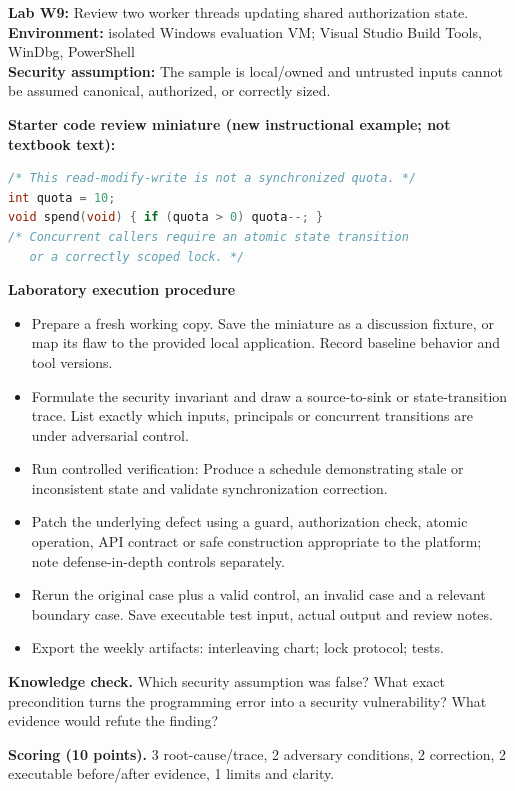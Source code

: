 \documentclass[10pt,letterpaper]{article}
\begin{document}
\begin{insight}\textbf{Lab W9:} Review two worker threads updating shared authorization state.\\\textbf{Environment:} isolated Windows evaluation VM; Visual Studio Build Tools, WinDbg, PowerShell\\\textbf{Security assumption:} The sample is local/owned and untrusted inputs cannot be assumed canonical, authorized, or correctly sized.\end{insight}
\textbf{Starter code review miniature (new instructional example; not textbook text):}
\begin{lstlisting}[language=C]
/* This read-modify-write is not a synchronized quota. */
int quota = 10;
void spend(void) { if (quota > 0) quota--; }
/* Concurrent callers require an atomic state transition
   or a correctly scoped lock. */
\end{lstlisting}
\textbf{Laboratory execution procedure}
\begin{itemize}[leftmargin=*,itemsep=2pt]
\item Prepare a fresh working copy. Save the miniature as a discussion fixture, or map its flaw to the provided local application. Record baseline behavior and tool versions.
\item Formulate the security invariant and draw a source-to-sink or state-transition trace. List exactly which inputs, principals or concurrent transitions are under adversarial control.
\item Run controlled verification: Produce a schedule demonstrating stale or inconsistent state and validate synchronization correction.
\item Patch the underlying defect using a guard, authorization check, atomic operation, API contract or safe construction appropriate to the platform; note defense-in-depth controls separately.
\item Rerun the original case plus a valid control, an invalid case and a relevant boundary case. Save executable test input, actual output and review notes.
\item Export the weekly artifacts: interleaving chart; lock protocol; tests.
\end{itemize}
\textbf{Knowledge check.} Which security assumption was false? What exact precondition turns the programming error into a security vulnerability? What evidence would refute the finding?

\textbf{Scoring (10 points).} 3 root-cause/trace, 2 adversary conditions, 2 correction, 2 executable before/after evidence, 1 limits and clarity.
\end{document}
